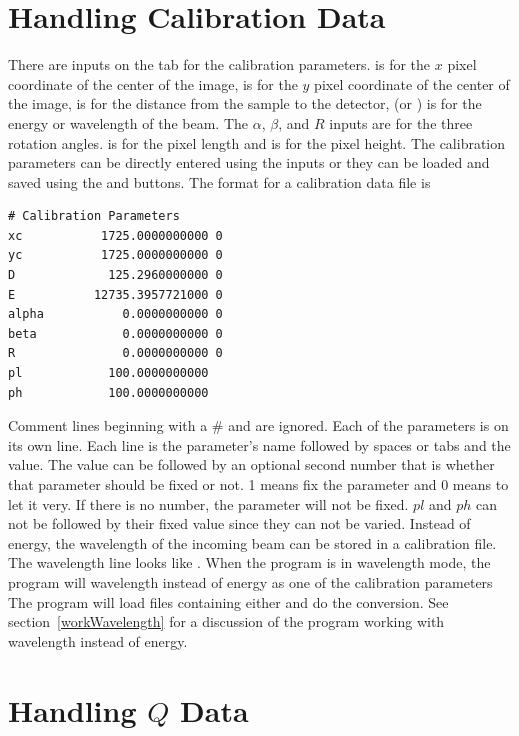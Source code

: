 \section{Handling Calibration Data}

There are inputs on the  tab 
for the calibration parameters.
 is for the $x$ pixel coordinate of the center of
the image,  is for the $y$ pixel coordinate of
the center of the image,  is for the distance from
the sample to the detector,
 (or \gui{$\lambda$:}) is for the energy
or wavelength of the beam. The $\alpha$, $\beta$, and
$R$ inputs are for the three rotation angles. 
 is for the pixel length
and  is for the pixel height.
The calibration parameters can be directly entered
using the inputs or they can be loaded and saved 
using the  and  
buttons. The format for a calibration data file is 
\begin{lstlisting}
# Calibration Parameters
xc           1725.0000000000 0
yc           1725.0000000000 0
D             125.2960000000 0
E           12735.3957721000 0
alpha           0.0000000000 0
beta            0.0000000000 0
R               0.0000000000 0
pl            100.0000000000
ph            100.0000000000
\end{lstlisting}
Comment lines beginning with
a \# and are ignored. Each of the parameters
is on its own line. Each line is the parameter's 
name followed by spaces or tabs and the
value. The value can be followed by an optional
second number that is whether that parameter
should be fixed or not. 1 means fix the parameter and 0 
means to let it very. If there is no number, the parameter will
not be fixed. $pl$ and $ph$ can not be followed by their fixed value
since they can not be varied.
Instead of energy, the wavelength of the incoming
beam can be stored in a calibration file.
The wavelength line looks like 
.
When the program is in wavelength mode, the program
will wavelength instead of energy as one of the calibration parameters 
The program will load files containing either and do the 
conversion. See section~\ref{workWavelength} for a discussion
of the program working with wavelength instead of energy.


\section{\texorpdfstring{Handling $Q$ Data}{Handling Q Data}}
\label{TheQValues}

